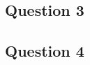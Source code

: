 \documentclass{article}
\begin{document}

\subsection*{Question 3}





\subsection*{Question 4}





\end{document}
